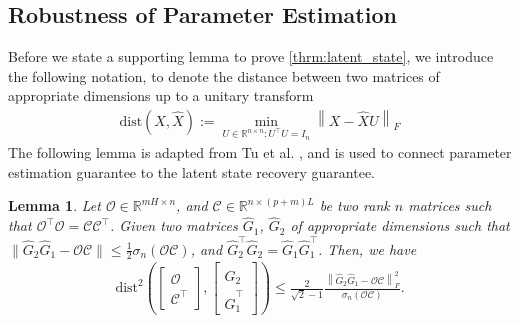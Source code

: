 \documentclass[11pt]{article}
\newtheorem{lemma}{Lemma}
\renewcommand{\cite}{\citep}
\newcommand{\Xhat}{\hat{X}}
\newcommand{\Ccal}{\mathcal{C}}
\newcommand{\Ocal}{\mathcal{O}}
\newcommand{\dist}[1]{\text{dist}\left(#1\right)}
\newcommand{\distsqr}[1]{\text{dist}^2\left(#1\right)}
\newcommand{\norm}[1]{\|{#1} \|}
\newcommand{\R}{\mathbb{R}}				%
\newcommand{\T}{\top}
\newcommand{\fronorm}[1]{\left\|#1\right\|_{F}}
\newcommand{\<}{\langle}
\renewcommand{\>}{\rangle}
\numberwithin{equation}{section}
\begin{document}
\subsection{Robustness of Parameter Estimation}
Before we state a supporting lemma to prove \ref{thrm:latent_state}, we introduce the following notation, to denote the distance between two matrices of appropriate dimensions up to a unitary transform
\begin{align}
	\dist{X, \Xhat} := \min_{U \in \R^{n \times n}: U^\T U = I_n} \fronorm{X  -  \Xhat U}
\end{align}
The following lemma is adapted from Tu et al. \cite{tu2016low}, and is used to connect parameter estimation guarantee to the latent state recovery guarantee. 
\begin{lemma}\label{lemma:Stephen_Low_Rank}
	Let $\Ocal \in \R^{mH \times n}$, and $\Ccal \in \R^{n \times (p+m)L}$ be two rank $n$ matrices such that $\Ocal^\T \Ocal = \Ccal \Ccal^\T$. Given two matrices $\hat{G}_1$, $\hat{G}_2$ of appropriate dimensions such that $\norm{\hat{G}_2 \hat{G}_1 - \Ocal \Ccal}\leq \frac{1}{2} \sigma_{n}\left(\Ocal \Ccal\right)$, and $\hat{G}_2^\T \hat{G}_2 = \hat{G}_1 \hat{G}_1^\T$. Then, we have
	\begin{align}
		\distsqr{\begin{bmatrix}\Ocal \\ \Ccal^\T\end{bmatrix}, 
			\begin{bmatrix}\hat{G}_2 \\ \hat{G}_1^\T \end{bmatrix}} \leq 
		\frac{2}{\sqrt{2} - 1} \frac{\fronorm{\hat{G}_2 \hat{G}_1 - \Ocal \Ccal}^2}{\sigma_{n}\left(\Ocal \Ccal\right)}.
	\end{align}
\end{lemma}
\end{document}
